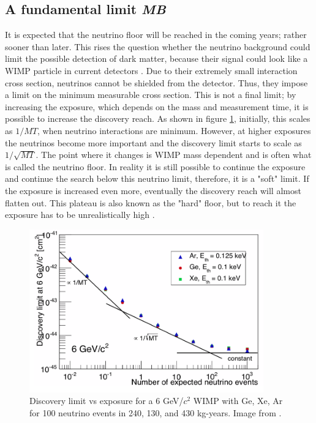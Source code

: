\documentclass{article}
\begin{document}
\subsection{A fundamental limit \small{\textit{MB}}}

It is expected that the neutrino floor will be reached in the coming years; rather sooner than later. This rises the question whether the neutrino background could limit the possible detection of dark matter, because their signal could look like a WIMP particle in current detectors \cite{Gutlein:2010tq,Billard:2013qya}. Due to their extremely small interaction cross section, neutrinos cannot be shielded from the detector. Thus, they impose a limit on the minimum measurable cross section. This is not a final limit; by increasing the exposure, which depends on the mass and measurement time, it is possible to increase the discovery reach. As shown in figure \ref{discovery_limit}, initially, this scales as $1/MT$, when neutrino interactions are minimum. However, at higher exposures the neutrinos become more important and the discovery limit starts to scale as $1/\sqrt{MT}$. The point where it changes is WIMP mass dependent and is often what is called the neutrino floor. In reality it is still possible to continue the exposure and continue the search below this neutrino limit, therefore, it is a "soft" limit. If the exposure is increased even more, eventually the discovery reach will almost flatten out. This plateau is also known as the "hard" floor, but to reach it the exposure has to be unrealistically high \cite{Wyenberg:2018eyv}. 

\begin{figure}[h!]
    \centering
    \includegraphics[width=0.9\textwidth]{Discovery_limit.png}
    \caption{Discovery limit vs exposure for a 6 GeV/$c^2$ WIMP with Ge, Xe, Ar for 100 neutrino events in 240, 130, and 430 kg-years. Image from \cite{Billard:2013qya}.}
    \label{discovery_limit}
\end{figure}
\end{document}
